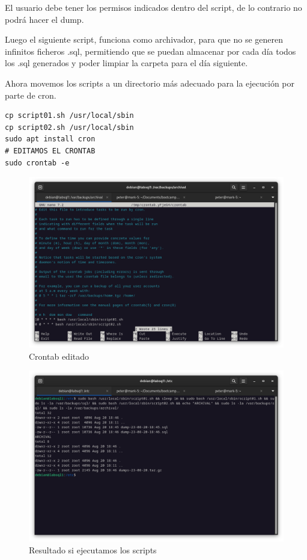El usuario debe tener los permisos indicados dentro del script, de lo contrario no podrá hacer el dump.



\newpage
Luego el siguiente script, funciona como archivador, para que no se generen infinitos ficheros .sql, permitiendo que se puedan almacenar por cada día todos los .sql generados y poder limpiar la carpeta para el día siguiente.




Ahora movemos los scripts a un directorio más adecuado para la ejecución por parte de cron.

\begin{lstlisting}[style=mybash]
cp script01.sh /usr/local/sbin
cp script02.sh /usr/local/sbin
sudo apt install cron
# EDITAMOS EL CRONTAB
sudo crontab -e
\end{lstlisting}

\begin{figure}[H]
	\centering
	\includegraphics[scale=0.30]{07}
	\caption{Crontab editado}
\end{figure}

\begin{figure}[H]
	\centering
	\includegraphics[scale=0.30]{08}
	\caption{Resultado si ejecutamos los scripts}
\end{figure}

